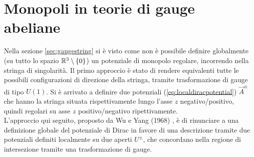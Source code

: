 \chapter{Monopoli in teorie di gauge abeliane}
Nella sezione \ref{sec:gaugestring} si è visto come non è possibile definire globalmente
(su tutto lo spazio $\mathbb{R}^3 \setminus \{0\}$) un potenziale di monopolo regolare,
incorrendo nella stringa di singolarità. Il primo approccio è stato di rendere
equivalenti tutte le possibili configurazioni di direzione della stringa, tramite
trasformazione di gauge di tipo $U(1)$. Si è arrivato a definire due potenziali
(\ref{eq:localdiracpotential}) $\vec A ^\pm$ che hanno la stringa situata rispettivamente
lungo l'asse $z$ negativo/positivo, quindi regolari su asse $z$ positivo/negativo
ripettivamente.\\
L'approccio qui seguito, proposto da Wu e Yang (1968) \cite{wuyang}, è di
rinunciare a una definizione globale del potenziale di Dirac
in favore di una descrizione tramite due potenziali definiti localmente su due aperti
$U^\pm$, che concordano nella regione di intersezione tramite una trasformazione
di gauge.\\

